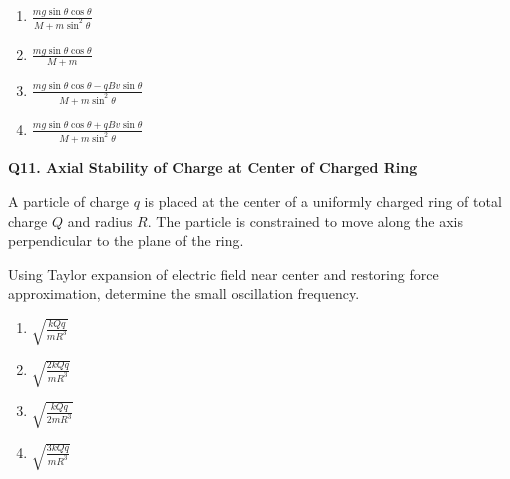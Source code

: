 \documentclass[12pt]{article}
\begin{document}
\begin{center}
\end{center}

\begin{enumerate}
\item[(A)] $\frac{mg\sin\theta\cos\theta}{M+m\sin^2\theta}$
\item[(B)] $\frac{mg\sin\theta\cos\theta}{M+m}$
\item[(C)] $\frac{mg\sin\theta\cos\theta-qBv\sin\theta}{M+m\sin^2\theta}$
\item[(D)] $\frac{mg\sin\theta\cos\theta+qBv\sin\theta}{M+m\sin^2\theta}$
\end{enumerate}


\textbf{Q11. Axial Stability of Charge at Center of Charged Ring}

A particle of charge $q$ is placed at the center of a uniformly charged ring of total charge $Q$ and radius $R$. The particle is constrained to move along the axis perpendicular to the plane of the ring.  

Using Taylor expansion of electric field near center and restoring force approximation, determine the small oscillation frequency.

\begin{enumerate}
\item[(A)] $\sqrt{\frac{kQq}{mR^3}}$
\item[(B)] $\sqrt{\frac{2kQq}{mR^3}}$
\item[(C)] $\sqrt{\frac{kQq}{2mR^3}}$
\item[(D)] $\sqrt{\frac{3kQq}{mR^3}}$
\end{enumerate}
\end{document}
